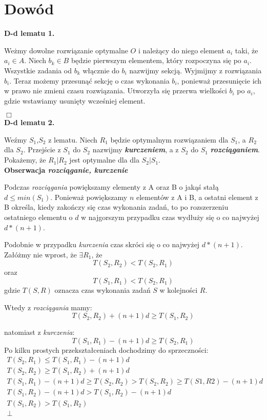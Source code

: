 \documentclass[11pt, wide]{article}
\begin{document}
    \section{Dowód}
    
    \textbf{D-d lematu 1.}

    Weżmy dowolne rozwiązanie optymalne $O$ i należący do niego 
    element $a_i$ taki, że $a_i \in A$. Niech $b_k \in B$ będzie pierwszym elementem, który rozpoczyna się po $a_i$. 
    Wszystkie zadania od $b_k$ włącznie do $b_i$ nazwijmy sekcją. 
    Wyjmijmy z rozwiązania $b_i$. Teraz możemy przesunąć sekcję o czas wykonania $b_i$, ponieważ przesunięcie ich w prawo
    nie zmieni czasu rozwiązania. Utworzyła się przerwa wielkości $b_i$ po $a_i$, gdzie wstawiamy usunięty wcześniej element.
    
    \hspace*{12cm} $\Box$
    \\
    
    \textbf{D-d lematu 2.}

    Weźmy $S_1$,$S_2$ z lematu. Niech $R_1$ będzie optymalnym
    rozwiązaniem dla $S_1$, a $R_2$ dla $S_2$. Przejście z $S_1$ do $S_2$ nazwijmy
    \textbf{\textit{kurczeniem}}, a z $S_2$ do $S_1$ \textbf{\textit{rozciąganiem}}. Pokażemy, że
    $R_1|R_2$ jest optymalne dla dla $S_2|S_1$.     
    \\

    \textbf{Obserwacja \textit{rozciąganie, kurczenie}}

    Podczas \textit{rozciągania} powiększamy elementy z A oraz B
    o jakąś stałą $d \leq min(S_1)$. Ponieważ powiększamy $n$ elementów z A i B, a ostatni element z B 
    określa, kiedy zakończy się czas wykonania zadań, to po rozszerzeniu ostatniego elementu o $d$ w najgorszym 
    przypadku czas wydłuży się o co najwyżej $d*(n+1)$.

    Podobnie w przypadku \textit{kurczenia} czas skróci się o co najwyżej $d*(n+1)$.
    \\

    Załóżmy nie wprost, że $\exists R_1$, że \
    $$T(S_2, R_2) < T(S_2, R_1)$$ oraz $$T(S_1, R_1) < T(S_2, R_1)$$ gdzie $T(S,R)$ 
    oznacza czas wykonania zadań $S$ w kolejności $R$.

    Wtedy z \textit{rozciągania} mamy: $$T(S_2, R_2) + (n+1)d \geq T(S_1, R_2) $$

    natomiast z \textit{kurczenia}: $$T(S_1, R_1) - (n+1)d \geq T(S_2, R_1)$$
    Po kilku prostych przekształceniach dochodzimy do sprzeczności:
    \begin{gather*}
        T(S_2, R_1) \leq T(S_1, R_1) - (n+1)d \\
        T(S_2, R_2) \geq T(S_1, R_2) + (n+1)d \\
        T(S_1, R_1) - (n+1)d \geq T(S_2, R_2) > T(S_2, R_2) \geq T(S1, R2) - (n+1)d \\
        T(S_1, R_2) - (n+1)d > T(S_1, R_2) - (n+1)d \\
        T(S_1, R_2) > T(S_1, R_2) \\
        \bot
    \end{gather*}
\end{document}
